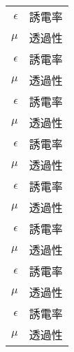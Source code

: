\begin{nomenclature}
\begin{longtable}{rl}
  $\epsilon$ & 誘電率 \\
  $\mu$      & 透過性 \\
  $\epsilon$ & 誘電率 \\
  $\mu$      & 透過性 \\
  $\epsilon$ & 誘電率 \\
  $\mu$      & 透過性 \\
  $\epsilon$ & 誘電率 \\
  $\mu$      & 透過性 \\
  $\epsilon$ & 誘電率 \\
  $\mu$      & 透過性 \\
  $\epsilon$ & 誘電率 \\
  $\mu$      & 透過性 \\
  $\epsilon$ & 誘電率 \\
  $\mu$      & 透過性 \\
  $\epsilon$ & 誘電率 \\
  $\mu$      & 透過性 \\
\end{longtable}

\end{nomenclature}
